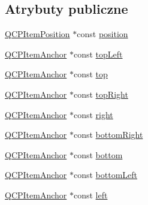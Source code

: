 \subsection*{Atrybuty publiczne}
\begin{DoxyCompactItemize}
\item 
\hyperlink{class_q_c_p_item_position}{Q\+C\+P\+Item\+Position} $\ast$const \hyperlink{class_q_c_p_item_text_a0d228a00e819022b5690c65762721129}{position}
\item 
\hyperlink{class_q_c_p_item_anchor}{Q\+C\+P\+Item\+Anchor} $\ast$const \hyperlink{class_q_c_p_item_text_a6354d8762182a3502103fabe5fbb8512}{top\+Left}
\item 
\hyperlink{class_q_c_p_item_anchor}{Q\+C\+P\+Item\+Anchor} $\ast$const \hyperlink{class_q_c_p_item_text_a5c87ee162cbbe3d166b97826c8849304}{top}
\item 
\hyperlink{class_q_c_p_item_anchor}{Q\+C\+P\+Item\+Anchor} $\ast$const \hyperlink{class_q_c_p_item_text_ad18ac45cb4cc135de1eb78f2e86b6504}{top\+Right}
\item 
\hyperlink{class_q_c_p_item_anchor}{Q\+C\+P\+Item\+Anchor} $\ast$const \hyperlink{class_q_c_p_item_text_aef159622ce6502412e782a21ba6d84f2}{right}
\item 
\hyperlink{class_q_c_p_item_anchor}{Q\+C\+P\+Item\+Anchor} $\ast$const \hyperlink{class_q_c_p_item_text_a8ad47045c29af43b0312f7d93bb74374}{bottom\+Right}
\item 
\hyperlink{class_q_c_p_item_anchor}{Q\+C\+P\+Item\+Anchor} $\ast$const \hyperlink{class_q_c_p_item_text_a94aeec080f877d3d1d0c3d8ffc10e9e6}{bottom}
\item 
\hyperlink{class_q_c_p_item_anchor}{Q\+C\+P\+Item\+Anchor} $\ast$const \hyperlink{class_q_c_p_item_text_a6a1c872ad3789ecafcaeac2066e218a0}{bottom\+Left}
\item 
\hyperlink{class_q_c_p_item_anchor}{Q\+C\+P\+Item\+Anchor} $\ast$const \hyperlink{class_q_c_p_item_text_ab8c6c6e1df36256986fab1463c0a1d38}{left}
\end{DoxyCompactItemize}
